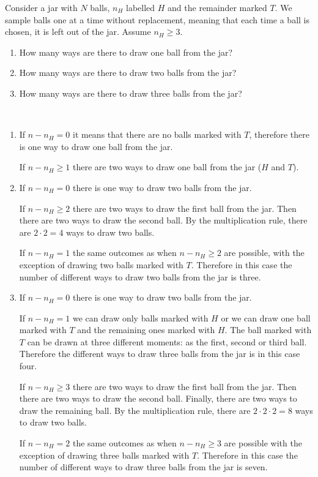 	\begin{exercise}
		Consider a jar with $N$ balls, $n_H$ labelled $H$ and the remainder marked $T$. We sample balls one at a time without replacement, meaning that each time a ball is chosen, it is left out of the jar. Assume $n_H \geq 3$.
		\begin{enumerate}
			\item How many ways are there to draw one ball from the jar?
			\item How many ways are there to draw two balls from the jar?
			\item How many ways are there to draw three balls from the jar?
		\end{enumerate}
		\begin{solution}~
			\begin{enumerate}
				\item If $n-n_H=0$ it means that there are no balls marked with $T$, therefore there is one way to draw one ball from the jar.
				
				If $n-n_H\geq 1$ there are two ways to draw one ball from the jar ($H$ and $T$).
				
				\item If $n-n_H=0$ there is one way to draw two balls from the jar.
				
				If $n-n_H\geq 2$ there are two ways to draw the first ball from the jar. Then there are two ways to draw the second ball. By the multiplication rule, there are $2 \cdot 2 = 4$ ways to draw two balls.
				
				If $n-n_H=1$ the same outcomes as when $n-n_H\geq 2$ are possible, with the exception of drawing two balls marked with $T$. Therefore in this case the number of different ways to draw two balls from the jar is three.
				
				\item If $n-n_H=0$ there is one way to draw two balls from the jar.
				
				If $n-n_H=1$ we can draw only balls marked with $H$ or we can draw one ball marked with $T$ and the remaining ones marked with $H$. The ball marked with $T$ can be drawn at three different moments: as the first, second or third ball. Therefore the different ways to draw three balls from the jar is in this case four. 

				If $n-n_H\geq 3$ there are two ways to draw the first ball from the jar. Then there are two ways to draw the second ball. Finally, there are two ways to draw the remaining ball. By the multiplication rule, there are $2 \cdot 2 \cdot 2 = 8$ ways to draw two balls.

				If $n-n_H=2$ the same outcomes as when $n-n_H\geq 3$ are possible with the exception of drawing three balls marked with $T$. Therefore in this case the number of different ways to draw three balls from the jar is seven.
			\end{enumerate}
		\end{solution}
	\end{exercise}
	 
